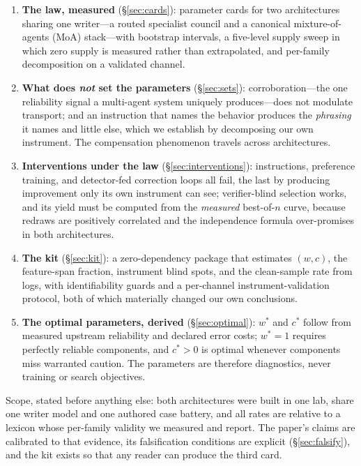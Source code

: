 \documentclass[11pt]{article}
\newcommand{\ww}{\ensuremath{w}}
\newcommand{\cc}{\ensuremath{c}}
\begin{document}
\begin{enumerate}
\item \textbf{The law, measured} (\S\ref{sec:cards}): parameter cards for two
architectures sharing one writer---a routed specialist council and a
canonical mixture-of-agents (MoA) stack---with bootstrap intervals, a
five-level supply sweep in which zero supply is measured rather than
extrapolated, and per-family decomposition on a validated channel.
\item \textbf{What does \emph{not} set the parameters} (\S\ref{sec:sets}):
corroboration---the one reliability signal a multi-agent system uniquely
produces---does not modulate transport; and an instruction that names the
behavior produces the \emph{phrasing} it names and little else, which we
establish by decomposing our own instrument. The compensation phenomenon
travels across architectures.
\item \textbf{Interventions under the law} (\S\ref{sec:interventions}):
instructions, preference training, and detector-fed correction loops all
fail, the last by producing improvement only its own instrument can see;
verifier-blind selection works, and its yield must be computed from the
\emph{measured} best-of-$n$ curve, because redraws are positively correlated
and the independence formula over-promises in both architectures.
\item \textbf{The kit} (\S\ref{sec:kit}): a zero-dependency package that
estimates $(\ww,\cc)$, the feature-span fraction, instrument blind spots, and
the clean-sample rate from logs, with identifiability guards and a
per-channel instrument-validation protocol, both of which materially changed
our own conclusions.
\item \textbf{The optimal parameters, derived} (\S\ref{sec:optimal}):
$\ww^{*}$ and $\cc^{*}$ follow from measured upstream reliability and
declared error costs; $\ww^{*}{=}1$ requires perfectly reliable components,
and $\cc^{*}{>}0$ is optimal whenever components miss warranted caution. The
parameters are therefore diagnostics, never training or search objectives.
\end{enumerate}

Scope, stated before anything else: both architectures were built in one lab,
share one writer model and one authored case battery, and all rates are
relative to a lexicon whose per-family validity we measured and report. The
paper's claims are calibrated to that evidence, its falsification conditions
are explicit (\S\ref{sec:falsify}), and the kit exists so that any reader can
produce the third card.
\end{document}
